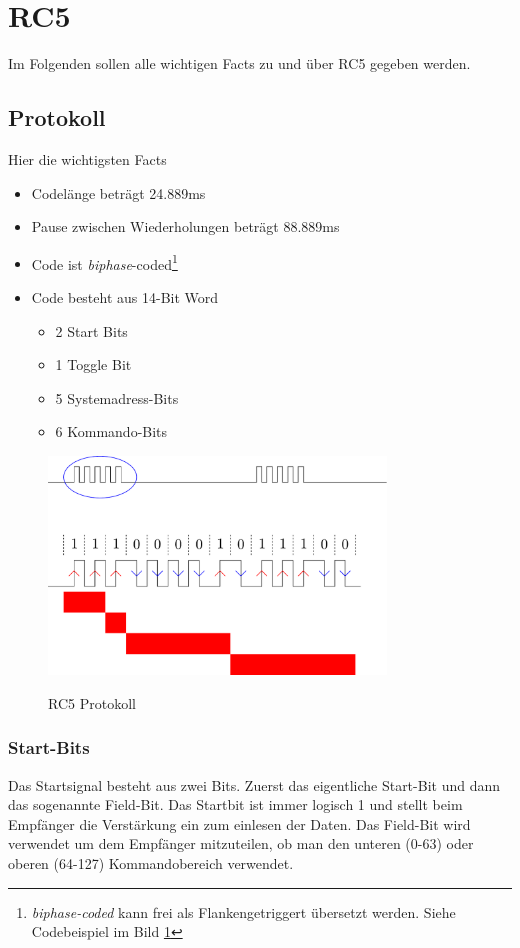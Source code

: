 \section{RC5}
Im Folgenden sollen alle wichtigen Facts zu und über RC5 gegeben werden.

\subsection{Protokoll}
Hier die wichtigsten Facts 
\begin{itemize}
    \item Codelänge beträgt 24.889ms
    \item Pause zwischen Wiederholungen beträgt 88.889ms
    \item Code ist \emph{biphase}-coded\footnote{
        \emph{biphase-coded} kann frei als Flankengetriggert übersetzt
        werden. Siehe Codebeispiel im Bild \ref{pic:rc5_simple} }
    \item Code besteht aus 14-Bit Word
    \begin{itemize}
        \item 2 Start Bits
        \item 1 Toggle Bit
        \item 5 Systemadress-Bits
        \item 6 Kommando-Bits
    \end{itemize}
\end{itemize}

\begin{figure}[h!]
    \centering
    \includegraphics[width=0.8\textwidth]{rc5_simple.pdf}
    \label{pic:rc5_simple}
    \caption{RC5 Protokoll}
\end{figure}

\subsubsection{Start-Bits}
Das Startsignal besteht aus zwei Bits. Zuerst das eigentliche Start-Bit
und dann das sogenannte Field-Bit. Das Startbit ist immer logisch 1 und
stellt beim Empfänger die Verstärkung ein zum einlesen der Daten.
Das Field-Bit wird verwendet um dem Empfänger mitzuteilen, ob man den
unteren (0-63) oder oberen (64-127) Kommandobereich verwendet.
